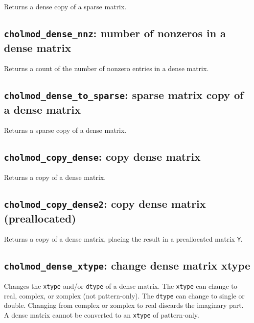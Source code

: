 \documentclass[11pt]{article}
\begin{document}

Returns a dense copy of a sparse matrix.

\subsection{{\tt cholmod\_dense\_nnz}: number of nonzeros in a dense matrix}


Returns a count of the number of nonzero entries in a dense matrix.

\subsection{{\tt cholmod\_dense\_to\_sparse}: sparse matrix copy of a dense matrix}


Returns a sparse copy of a dense matrix.

\subsection{{\tt cholmod\_copy\_dense}: copy dense matrix}


Returns a copy of a dense matrix.

\subsection{{\tt cholmod\_copy\_dense2}: copy dense matrix (preallocated)}


Returns a copy of a dense matrix, placing the result in a preallocated matrix
{\tt Y}.

\subsection{{\tt cholmod\_dense\_xtype}: change dense matrix xtype}


Changes the {\tt xtype} and/or \verb'dtype' of a dense matrix.
The \verb'xtype' can change to real, complex, or zomplex (not pattern-only).
The \verb'dtype' can change to single or double.
Changing from complex or zomplex to real discards the imaginary part.
A dense matrix cannot be converted to an \verb'xtype' of pattern-only.
\end{document}
